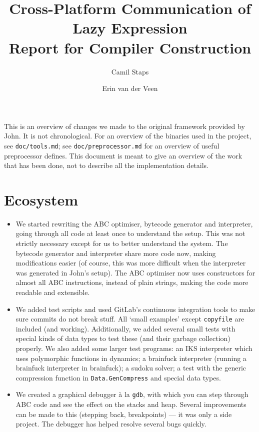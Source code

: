 \documentclass[a4paper]{article}
\title{Cross-Platform Communication of Lazy Expression\\\Large{Report for Compiler Construction}}
\author{Camil Staps \and Erin van der Veen}
\begin{document}
\maketitle

This is an overview of changes we made to the original framework provided by John.
It is not chronological.
For an overview of the binaries used in the project, see \texttt{doc/tools.md};
see \texttt{doc/preprocessor.md} for an overview of useful preprocessor defines.
This document is meant to give an overview of the work that has been done, not to describe all the implementation details.

\section*{Ecosystem}
\begin{itemize}
	\item
		We started rewriting the ABC optimiser, bytecode generator and interpreter,
			going through all code at least once to understand the setup.
		This was not strictly necessary except for us to better understand the system.
		The bytecode generator and interpreter share more code now, making modifications easier
			(of course, this was more difficult when the interpreter was generated in John's setup).
		The ABC optimiser now uses constructors for almost all ABC instructions, instead of plain strings,
			making the code more readable and extensible.

	\item
		We added test scripts and used GitLab's continuous integration tools to make sure commits do not break stuff.
		All `small examples' except \texttt{copyfile} are included (and working).
		Additionally, we added several small tests with special kinds of data types to test these (and their garbage collection) properly.
		We also added some larger test programs:
			an IKS interpreter which uses polymorphic functions in dynamics;
			a brainfuck interpreter (running a brainfuck interpreter in brainfuck);
			a sudoku solver;
			a test with the generic compression function in \texttt{Data.GenCompress} and special data types.

	\item
		We created a graphical debugger \`a la \texttt{gdb}, with which you can step through ABC code and see the effect on the stacks and heap.
		Several improvements can be made to this (stepping back, breakpoints) --- it was only a side project.
		The debugger has helped resolve several bugs quickly.
\end{itemize}
\end{document}
